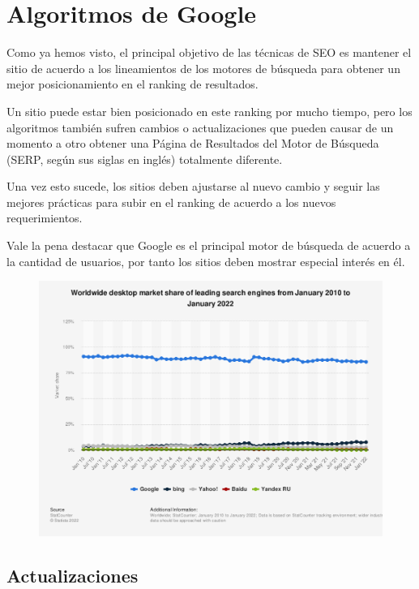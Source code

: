 \documentclass[12pt]{article}
\begin{document}
\section{Algoritmos de Google}

Como ya hemos visto, el principal objetivo de las técnicas de SEO es mantener el sitio de acuerdo a los lineamientos de los motores de búsqueda para obtener un mejor posicionamiento en el ranking de resultados.

Un sitio puede estar bien posicionado en este ranking por mucho tiempo, pero los algoritmos también sufren cambios o actualizaciones que pueden causar de un momento a otro obtener una Página de Resultados del Motor de Búsqueda (SERP, según sus siglas en inglés) totalmente diferente.

Una vez esto sucede, los sitios deben ajustarse al nuevo cambio y seguir las mejores prácticas para subir en el ranking de acuerdo a los nuevos requerimientos.

Vale la pena destacar que Google es el principal motor de búsqueda de acuerdo a la cantidad de usuarios, por tanto los sitios deben mostrar especial interés en él.

\begin{figure}[!h]
    \centering
    \includegraphics[width=\linewidth]{images/216573.png}
  \end{figure}
\subsection{Actualizaciones}
\end{document}
